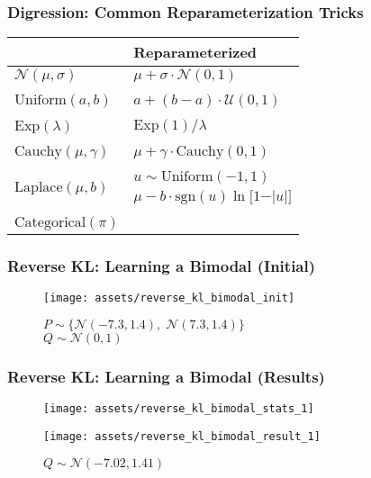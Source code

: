 \documentclass{beamer}
\newcommand{\xmark}{\textcolor{red}{\ding{55}}}
\begin{document}
\begin{frame}
  \frametitle{Digression: Common Reparameterization Tricks}
  \begin{center}
  \begin{tabular}{C{5cm}C{5cm}}
  \toprule
  {} & Reparameterized \\
  \midrule
  $\mathcal{N}(\mu, \sigma)$   &  $\mu + \sigma \cdot \mathcal{N}(0, 1)$ \\
  \\
  $\text{Uniform}(a, b)$   &  $a + (b - a) \cdot \mathcal{U}(0, 1)$ \\
  \\
  $\text{Exp}(\lambda)$   &  $\text{Exp}(1) / \lambda$ \\
  \\
  $\text{Cauchy}(\mu, \gamma)$   &  $\mu + \gamma \cdot \text{Cauchy}(0, 1)$ \\
  \\
    &  $u \sim \text{Uniform}(-1, 1)$ \\
                                          & $\mu - b \cdot \text{sgn}(u) \ln \big[ 1 - \vert u \vert \big]$ \\
                                          \\
  $\text{Categorical}(\pi)$ & \xmark \\
  \bottomrule
  \end{tabular}
  \end{center}
\end{frame}

\begin{frame}
  \frametitle{Reverse KL: Learning a Bimodal (Initial)}
  \begin{figure}
    \centering
    \texttt{[image: assets/reverse\_kl\_bimodal\_init]}
    \caption{$P \sim \big\{\mathcal{N}(-7.3, 1.4), \; \mathcal{N}(7.3, 1.4) \big\}$\\$Q \sim \mathcal{N}(0, 1)$}
  \end{figure}
\end{frame}

\begin{frame}
  \frametitle{Reverse KL: Learning a Bimodal (Results)}
  \begin{figure}
    \centering
    \texttt{[image: assets/reverse\_kl\_bimodal\_stats\_1]}
  \end{figure}
  \begin{figure}
    \centering
    \texttt{[image: assets/reverse\_kl\_bimodal\_result\_1]}
    \caption{$Q \sim \mathcal{N}(-7.02, 1.41)$}
  \end{figure}
\end{frame}
\end{document}
